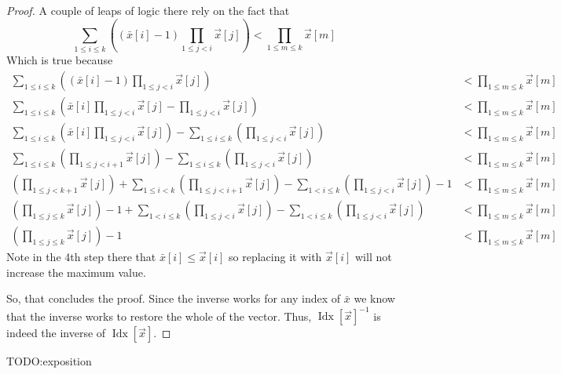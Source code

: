 \documentclass[12pt]{book}
\theoremstyle{plain}
\theoremstyle{definition}
\theoremstyle{ppart}
\theoremstyle{case}
\theoremstyle{solution}
\DeclareMathOperator{\Idx}{Idx}
\begin{document}
\begin{landscape}
\begin{proof}
A couple of leaps of logic there rely on the fact that 
\[
  \sum_{1 \le i \le k} \left( (\bar{x}[i]-1) \prod_{1 \le j < i} \vec{x}[j] \right)
  < \prod_{1 \le m \le k} \vec{x}[m]
\]
Which is true because
\begin{align*}
  \sum_{1 \le i \le k} \left( (\bar{x}[i]-1) \prod_{1 \le j < i} \vec{x}[j] \right)
  &< \prod_{1 \le m \le k} \vec{x}[m] \\
  \sum_{1 \le i \le k} \left( \bar{x}[i]\prod_{1 \le j < i} \vec{x}[j] - \prod_{1 \le j < i} \vec{x}[j] \right)
  &< \prod_{1 \le m \le k} \vec{x}[m] \\
  \sum_{1 \le i \le k} \left( \bar{x}[i]\prod_{1 \le j < i} \vec{x}[j] \right)
  - \sum_{1 \le i \le k} \left( \prod_{1 \le j < i} \vec{x}[j] \right)
  &< \prod_{1 \le m \le k} \vec{x}[m] \\
  \sum_{1 \le i \le k} \left( \prod_{1 \le j < i+1} \vec{x}[j] \right)
  - \sum_{1 \le i \le k} \left( \prod_{1 \le j < i} \vec{x}[j] \right)
  &< \prod_{1 \le m \le k} \vec{x}[m] \\
  \left( \prod_{1 \le j < k+1} \vec{x}[j] \right)
  + \sum_{1 \le i < k} \left( \prod_{1 \le j < i+1} \vec{x}[j] \right)
  - \sum_{1 < i \le k} \left( \prod_{1 \le j < i} \vec{x}[j] \right)
  - 1
  &< \prod_{1 \le m \le k} \vec{x}[m] \\
  \left( \prod_{1 \le j \le k} \vec{x}[j] \right)-1
  + \sum_{1 < i \le k} \left( \prod_{1 \le j < i} \vec{x}[j] \right)
  - \sum_{1 < i \le k} \left( \prod_{1 \le j < i} \vec{x}[j] \right)
  &< \prod_{1 \le m \le k} \vec{x}[m] \\
  \left( \prod_{1 \le j \le k} \vec{x}[j] \right)-1
  &< \prod_{1 \le m \le k} \vec{x}[m]
\end{align*}
Note in the 4th step there that $\bar{x}[i] \le \vec{x}[i]$ so replacing it with $\vec{x}[i]$
will not increase the maximum value.

So, that concludes the proof. Since the inverse works for any index of $\bar{x}$ we know that the inverse works to restore the
whole of the vector. Thus, $\Idx[\vec{x}]^{-1}$ is indeed the inverse of $\Idx[\vec{x}]$.
\end{proof}

TODO:exposition 


\end{landscape}
\end{document}
